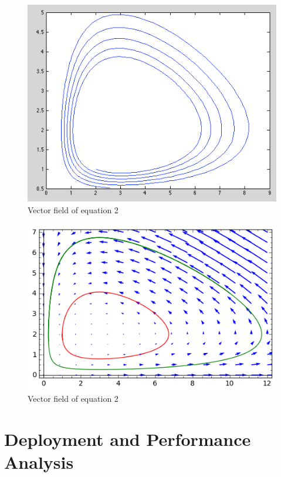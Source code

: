 \documentclass[12pt,a4paper]{article}
\begin{document}
\begin{figure}[hb]
    \centering
    \includegraphics[scale=0.5]{images/diverge.png}
    \caption{Vector field of equation 2}
\end{figure}




\begin{figure}[hb]
    \centering
    \includegraphics[scale=0.75]{images/sage1.png}
    \caption{Vector field of equation 2}
\end{figure}

\clearpage



\section{Deployment and Performance Analysis}
\end{document}
